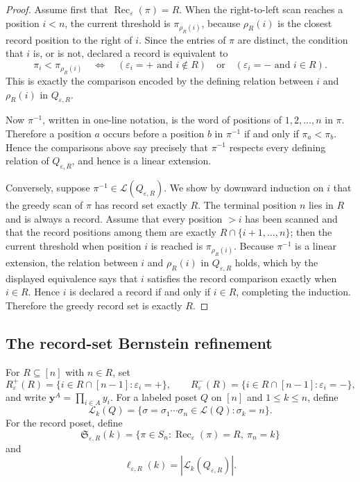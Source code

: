 \documentclass[11pt,letterpaper,reqno]{amsart}
\theoremstyle{definition}
\newcommand{\eps}{\varepsilon}
\begin{document}
\begin{proof}
Assume first that \(\operatorname{Rec}_\eps(\pi)=R\).  When the
right-to-left scan reaches a position \(i<n\), the current threshold is
\(\pi_{\rho_R(i)}\), because \(\rho_R(i)\) is the closest record position to
the right of \(i\).  Since the entries of \(\pi\) are distinct, the condition
that \(i\) is, or is not, declared a record is equivalent to
\[
\pi_i<\pi_{\rho_R(i)}
\quad\Longleftrightarrow\quad
(\eps_i=+\text{ and }i\notin R)
\quad\text{or}\quad
(\eps_i=-\text{ and }i\in R).
\]
This is exactly the comparison encoded by the defining relation between
\(i\) and \(\rho_R(i)\) in \(Q_{\eps,R}\).

Now \(\pi^{-1}\), written in one-line notation, is the word of positions of
\(1,2,\ldots,n\) in \(\pi\).  Therefore a position \(a\) occurs before a
position \(b\) in \(\pi^{-1}\) if and only if \(\pi_a<\pi_b\).  Hence the
comparisons above say precisely that \(\pi^{-1}\) respects every defining
relation of \(Q_{\eps,R}\), and hence is a linear extension.

Conversely, suppose \(\pi^{-1}\in\mathcal L(Q_{\eps,R})\).  We show by
downward induction on \(i\) that the greedy scan of \(\pi\) has record set
exactly \(R\).  The terminal position \(n\) lies in \(R\) and is always a
record.  Assume that every position \(>i\) has been scanned and that the
record positions among them are exactly \(R\cap\{i+1,\ldots,n\}\); then the
current threshold when position \(i\) is reached is \(\pi_{\rho_R(i)}\).
Because \(\pi^{-1}\) is a linear extension, the relation between \(i\) and
\(\rho_R(i)\) in \(Q_{\eps,R}\) holds, which by the displayed equivalence
says that \(i\) satisfies the record comparison exactly when \(i\in R\).
Hence \(i\) is declared a record if and only if \(i\in R\), completing the
induction.  Therefore the greedy record set is exactly \(R\).
\end{proof}

\subsection{The record-set Bernstein refinement}

For \(R\subseteq[n]\) with \(n\in R\), set
\[
R_\eps^+(R)=\{i\in R\cap[n-1]:\eps_i=+\},\qquad
R_\eps^-(R)=\{i\in R\cap[n-1]:\eps_i=-\},
\]
and write \(\mathbf y^A=\prod_{i\in A}y_i\).  For a labeled poset \(Q\) on
\([n]\) and \(1\le k\le n\), define
\[
\mathcal L_k(Q)
 =\{\sigma=\sigma_1\cdots\sigma_n\in\mathcal L(Q):\sigma_k=n\}.
\]
For the record poset, define
\[
\mathfrak S_{\eps,R}(k)
 =\{\pi\in S_n:\operatorname{Rec}_\eps(\pi)=R,\ \pi_n=k\}
\]
and
\[
\ell_{\eps,R}(k)=|\mathcal L_k(Q_{\eps,R})|.
\]
\end{document}
